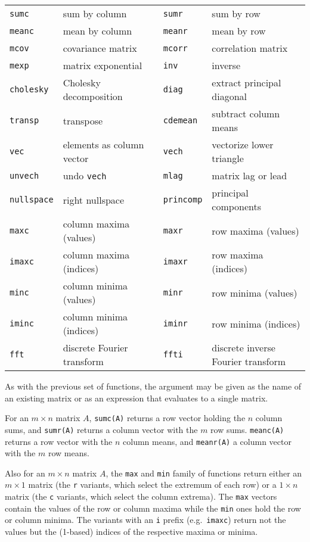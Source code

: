 \begin{center}
\begin{tabular}{llcll}
\texttt{sumc}    & sum by column & &
\texttt{sumr}    & sum by row \\
\texttt{meanc}   & mean by column & &
\texttt{meanr}   & mean by row \\
\texttt{mcov}    & covariance matrix & &
\texttt{mcorr}   & correlation matrix \\
\texttt{mexp}    & matrix exponential & &
\texttt{inv}     & inverse \\
\texttt{cholesky} & Cholesky decomposition & &
\texttt{diag}    & extract principal diagonal \\
\texttt{transp}  & transpose & &
\texttt{cdemean} & subtract column means \\ 
\texttt{vec}     & elements as column vector & &
\texttt{vech}    & vectorize lower triangle \\
\texttt{unvech}  & undo \texttt{vech} & &
\texttt{mlag}    & matrix lag or lead \\
\texttt{nullspace} & right nullspace & &
\texttt{princomp} & principal components \\
\texttt{maxc}      & column maxima (values) & &
\texttt{maxr}      & row maxima (values) \\
\texttt{imaxc}     & column maxima (indices) & &
\texttt{imaxr}     & row maxima (indices) \\
\texttt{minc}      & column minima (values) & &
\texttt{minr}      & row minima (values) \\
\texttt{iminc}     & column minima (indices) & &
\texttt{iminr}     & row minima (indices) \\
\texttt{fft}       & discrete Fourier transform & &
\texttt{ffti}      & discrete inverse Fourier transform 
\end{tabular}
\end{center}

As with the previous set of functions, the argument may be given as
the name of an existing matrix or as an expression that evaluates to a
single matrix.

For an $m \times n$ matrix $A$, \texttt{sumc(A)} returns a row vector
holding the $n$ column sums, and \texttt{sumr(A)} returns a column
vector with the $m$ row sums.  \texttt{meanc(A)} returns a row vector
with the $n$ column means, and \texttt{meanr(A)} a column vector with
the $m$ row means.

Also for an $m \times n$ matrix $A$, the \texttt{max} and \texttt{min}
family of functions return either an $m \times 1$ matrix (the
\texttt{r} variants, which select the extremum of each row) or a $1
\times n$ matrix (the \texttt{c} variants, which select the column
extrema).  The \texttt{max} vectors contain the values of the row or
column maxima while the \texttt{min} ones hold the row or column
minima.  The variants with an \texttt{i} prefix (e.g.\ \texttt{imaxc})
return not the values but the (1-based) indices of the respective
maxima or minima.

